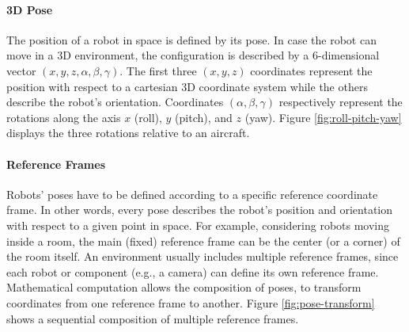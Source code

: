 \paragraph*{3D Pose} 
The position of a robot in space is defined by its pose. In case the robot can move in a 3D environment, the configuration is described by a 6-dimensional vector $(x, y, z, \alpha, \beta, \gamma)$. The first three $(x, y, z)$ coordinates represent the position with respect to a cartesian 3D coordinate system while the others describe the robot's orientation. Coordinates $(\alpha, \beta, \gamma)$ respectively represent the rotations along the axis $x$ (roll), $y$ (pitch), and $z$ (yaw). Figure \ref{fig:roll-pitch-yaw} displays the three rotations relative to an aircraft.

\paragraph*{Reference Frames} 
Robots' poses have to be defined according to a specific reference coordinate frame. In other words, every pose describes the robot's position and orientation with respect to a given point in space. For example, considering robots moving inside a room, the main (fixed) reference frame can be the center (or a corner) of the room itself. An environment usually includes multiple reference frames, since each robot or component (e.g., a camera) can define its own reference frame. Mathematical computation allows the composition of poses, to transform coordinates from one reference frame to another. Figure \ref{fig:pose-transform} shows a sequential composition of multiple reference frames.

